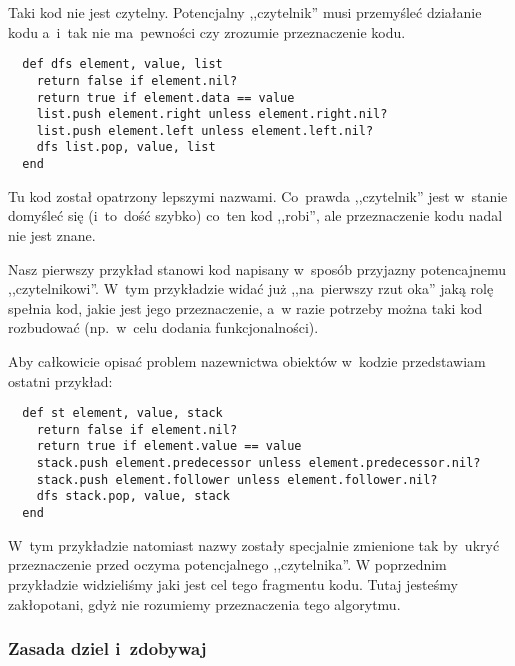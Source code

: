 Taki kod nie jest czytelny. Potencjalny ,,czytelnik'' musi przemyśleć działanie kodu a~i~tak nie ma~pewności czy zrozumie przeznaczenie kodu.

  \begin{lstlisting}
  def dfs element, value, list
    return false if element.nil?
    return true if element.data == value
    list.push element.right unless element.right.nil?
    list.push element.left unless element.left.nil?
    dfs list.pop, value, list
  end
  \end{lstlisting}

Tu kod został opatrzony lepszymi nazwami. Co~prawda ,,czytelnik'' jest w~stanie domyśleć się (i~to~dość szybko) co~ten kod ,,robi'', ale przeznaczenie kodu nadal nie jest znane.

Nasz pierwszy przykład stanowi kod napisany w~sposób przyjazny potencajnemu ,,czytelnikowi''. W~tym przykładzie widać już ,,na~pierwszy rzut oka'' jaką rolę spełnia kod, jakie jest jego przeznaczenie, a~w razie potrzeby można taki kod rozbudować (np.~w~celu dodania funkcjonalności).


Aby całkowicie opisać problem nazewnictwa obiektów w~kodzie przedstawiam ostatni przykład:
  \begin{lstlisting}
  def st element, value, stack
    return false if element.nil?
    return true if element.value == value
    stack.push element.predecessor unless element.predecessor.nil?
    stack.push element.follower unless element.follower.nil?
    dfs stack.pop, value, stack
  end
  \end{lstlisting}

W~tym przykładzie natomiast nazwy zostały specjalnie zmienione tak by~ukryć przeznaczenie przed oczyma potencjalnego ,,czytelnika''. W poprzednim przykładzie widzieliśmy jaki jest cel tego fragmentu kodu. Tutaj jesteśmy zakłopotani, gdyż nie rozumiemy przeznaczenia tego algorytmu.

\subsubsection{Zasada dziel i~zdobywaj} \label{dokumentacja.dzielizdobywaj}

